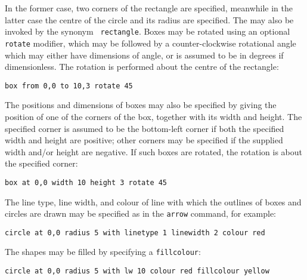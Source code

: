 \noindent In the former case, two corners of the rectangle are specified,
meanwhile in the latter case the centre of the circle and its radius are
specified. The  may also be invoked by the synonym {\tt
rectangle}. Boxes may be rotated using an optional {\tt
rotate} modifier, which may be followed by a counter-clockwise rotational angle
which may either have dimensions of angle, or is assumed to be in degrees if
dimensionless. The rotation is performed about the centre of the rectangle:

\begin{verbatim}
box from 0,0 to 10,3 rotate 45
\end{verbatim}

The positions and dimensions of boxes may also be specified by giving the
position of one of the corners of the box, together with its width and height.
The specified corner is assumed to be the bottom-left corner if both the
specified width and height are positive; other corners may be specified if the
supplied width and/or height are negative. If such boxes are rotated, the
rotation is about the specified corner:

\begin{verbatim}
box at 0,0 width 10 height 3 rotate 45
\end{verbatim}

The line type, line width, and colour of line with which the outlines of boxes
and circles are drawn may be specified as in the {\tt arrow} command, for
example:

\begin{verbatim}
circle at 0,0 radius 5 with linetype 1 linewidth 2 colour red
\end{verbatim}

\noindent The shapes may be filled by specifying a {\tt fillcolour}:

\begin{verbatim}
circle at 0,0 radius 5 with lw 10 colour red fillcolour yellow
\end{verbatim}

